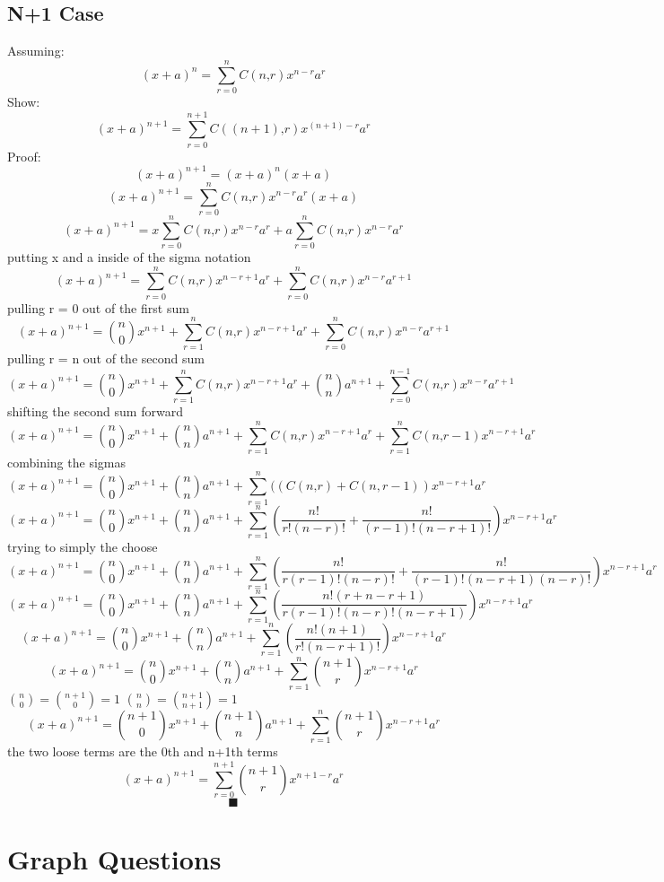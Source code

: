 \documentclass[a4paper,12pt]{article}
\begin{document}
\subsection{N+1 Case}
Assuming:
\[
(x+a)^n = \sum_{r=0}^n C(n‚ r)x^{n-r}a^r
\]
Show:
\[(x+a)^{n+1} = \sum_{r=0}^{n+1} C((n+1)‚ r)x^{(n+1)-r}a^r\]
Proof:
\[(x+a)^{n+1} =  (x+a)^n (x+a)\]
\[(x+a)^{n+1} =  \sum_{r=0}^n C(n‚ r)x^{n-r}a^r (x+a)\]
\[(x+a)^{n+1} =  x\sum_{r=0}^n C(n‚ r)x^{n-r}a^r + a\sum_{r=0}^n C(n‚ r)x^{n-r}a^{r}\] 
putting x and a inside of the sigma notation
\[(x+a)^{n+1} =  \sum_{r=0}^n C(n‚ r)x^{n-r+1}a^r + \sum_{r=0}^n C(n‚ r)x^{n-r}a^{r+1}\] 
pulling r = 0 out of the first sum
\[(x+a)^{n+1} =  \binom{n}{0} x^{n+1}+\sum_{r=1}^n C(n‚ r)x^{n-r+1}a^r + \sum_{r=0}^n C(n‚ r)x^{n-r}a^{r+1}\] 
pulling r = n out of the second sum
\[(x+a)^{n+1} =  \binom{n}{0} x^{n+1}+ \sum_{r=1}^n C(n‚ r)x^{n-r+1}a^r + \binom{n}{n}a^{n+1}+\sum_{r=0}^{n-1} C(n‚ r)x^{n-r}a^{r+1}\] 
shifting the second sum forward 
\[(x+a)^{n+1} =  \binom{n}{0} x^{n+1}+\binom{n}{n}a^{n+1}+ \sum_{r=1}^n C(n‚ r)x^{n-r+1}a^r + \sum_{r=1}^{n} C(n‚ r-1)x^{n-r+1}a^{r}\] 
combining the sigmas
\[(x+a)^{n+1} =  \binom{n}{0} x^{n+1}+\binom{n}{n}a^{n+1}+ \sum_{r=1}^n ((C(n‚ r)+C(n,r-1) )x^{n-r+1}a^r\]
\[(x+a)^{n+1} =  \binom{n}{0} x^{n+1}+\binom{n}{n}a^{n+1}+ \sum_{r=1}^n (\frac{n!}{r!(n-r)!}+\frac{n!}{(r-1)!(n-r+1)!} )x^{n-r+1}a^r\]
trying to simply the choose
\[(x+a)^{n+1} =  \binom{n}{0} x^{n+1}+\binom{n}{n}a^{n+1}+ \sum_{r=1}^n (\frac{n!}{r(r-1)!(n-r)!}+\frac{n!}{(r-1)!(n-r+1)(n-r)!} )x^{n-r+1}a^r\]
\[(x+a)^{n+1} =  \binom{n}{0} x^{n+1}+\binom{n}{n}a^{n+1}+ \sum_{r=1}^n (\frac{n!(r+n-r+1)}{r(r-1)!(n-r)!(n-r+1)})x^{n-r+1}a^r\]
\[(x+a)^{n+1} =  \binom{n}{0} x^{n+1}+\binom{n}{n}a^{n+1}+ \sum_{r=1}^n (\frac{n!(n+1)}{r!(n-r+1)!})x^{n-r+1}a^r\]
\[(x+a)^{n+1} =  \binom{n}{0} x^{n+1}+\binom{n}{n}a^{n+1}+ \sum_{r=1}^n \binom{n+1}{r}x^{n-r+1}a^r\]
$\binom{n}{0} = \binom{n+1}{0} = 1$
$\binom{n}{n} = \binom{n+1}{n+1} = 1$
\[(x+a)^{n+1} =  \binom{n+1}{0} x^{n+1}+\binom{n+1}{n}a^{n+1}+ \sum_{r=1}^n \binom{n+1}{r}x^{n-r+1}a^r\]
the two loose terms are the 0th and n+1th terms
\[(x+a)^{n+1} =  \sum_{r=0}^{n+1} \binom{n+1}{r}x^{n+1-r}a^r\]
\[\blacksquare\]
\pagebreak
\section{Graph Questions}
\end{document}
